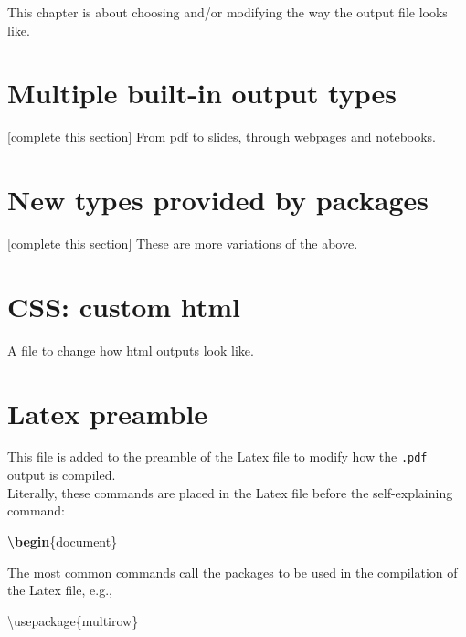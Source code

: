 \documentclass[]{book}
\newenvironment{Shaded}{}{}
\newcommand{\BuiltInTok}[1]{#1}
\newcommand{\ExtensionTok}[1]{#1}
\newcommand{\KeywordTok}[1]{\textcolor[rgb]{0.00,0.44,0.13}{\textbf{#1}}}
\newcommand{\NormalTok}[1]{#1}
\theoremstyle{definition}
\theoremstyle{definition}
\theoremstyle{definition}
\theoremstyle{remark}
\begin{document}
This chapter is about choosing and/or modifying the way the output file
looks like.

\hypertarget{multiple-built-in-output-types}{%
\section{Multiple built-in output
types}\label{multiple-built-in-output-types}}

{[}complete this section{]} From pdf to slides, through webpages and
notebooks.

\hypertarget{new-types-provided-by-packages}{%
\section{New types provided by
packages}\label{new-types-provided-by-packages}}

{[}complete this section{]} These are more variations of the above.

\hypertarget{css-custom-html}{%
\section{CSS: custom html}\label{css-custom-html}}

A file to change how html outputs look like.

\hypertarget{latex-preamble}{%
\section{Latex preamble}\label{latex-preamble}}

This file is added to the preamble of the Latex file to modify how the
\texttt{.pdf} output is compiled.\\
Literally, these commands are placed in the Latex file before the
self-explaining command:

\begin{Shaded}
\begin{Highlighting}[]
\KeywordTok{\textbackslash{}begin}\NormalTok{\{}\ExtensionTok{document}\NormalTok{\}}
\end{Highlighting}
\end{Shaded}

The most common commands call the packages to be used in the compilation
of the Latex file, e.g.,

\begin{Shaded}
\begin{Highlighting}[]
\BuiltInTok{\textbackslash{}usepackage}\NormalTok{\{}\ExtensionTok{multirow}\NormalTok{\}}
\end{Highlighting}
\end{Shaded}
\end{document}
